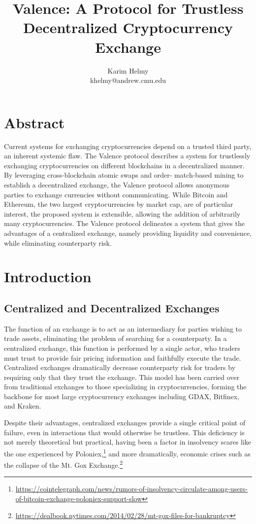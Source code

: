 \documentclass[a4paper]{article}
\title{Valence: A Protocol for Trustless Decentralized
		Cryptocurrency Exchange}
\author{Karim Helmy \\ khelmy@andrew.cmu.edu}
\begin{document}
\maketitle

\section*{Abstract}
	Current systems for exchanging cryptocurrencies depend on a
    trusted third party, an inherent systemic flaw.
    The Valence protocol describes a system for trustlessly
    exchanging cryptocurrencies on different blockchains in a decentralized
    manner. By leveraging cross-blockchain atomic swaps and order-
    match-based mining to establish a decentralized exchange, the
    Valence protocol allows anonymous parties to exchange currencies
    without communicating. While  Bitcoin and Ethereum, the two
    largest cryptocurrencies by market cap, are of particular
    interest, the proposed system is extensible, allowing the
    addition of arbitrarily many cryptocurrencies. The Valence
    protocol delineates a system that gives the advantages of a
    centralized exchange, namely providing liquidity and convenience,
    while eliminating counterparty risk.

\tableofcontents
\newpage
{}
\section*{Introduction}
	\subsection*{Centralized and Decentralized Exchanges}
    The function of an exchange is to act as an intermediary for parties
    wishing to trade assets, eliminating the problem of
    searching for a counterparty. In a centralized exchange, this function
    is performed by a single actor, who traders must trust to provide fair
    pricing information and faithfully execute the trade. Centralized exchanges
    dramatically decrease counterparty risk for traders by requiring only
    that they trust the exchange. This model has been carried over from
    traditional exchanges to those specializing in cryptocurrencies, forming
    the backbone for most large cryptocurrency exchanges including GDAX,
    Bitfinex, and Kraken.

    Despite their advantages,
	centralized exchanges provide a single critical point of failure,
    even in interactions that would otherwise be trustless. This
    deficiency is not merely theoretical but practical, having been a
    factor in insolvency scares like the one experienced by
    Poloniex,\footnote[1]
    {\url{https://cointelegraph.com/news/rumors-of-insolvency-circulate-among-users-of-bitcoin-exchange-poloniex-support-slow}} and more
    dramatically, economic crises such as the collapse of the Mt. Gox
    Exchange.\footnote[2]
    {\url{https://dealbook.nytimes.com/2014/02/28/mt-gox-files-for-bankruptcy}}
\end{document}
